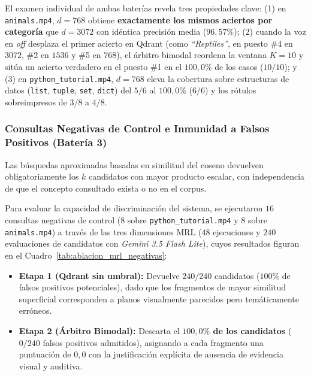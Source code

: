 El examen individual de ambas baterías revela tres propiedades clave: (1) en \texttt{animals.mp4}, $d=768$ obtiene \textbf{exactamente los mismos aciertos por categoría} que $d=3072$ con idéntica precisión media ($96,57\%$); (2) cuando la voz en \textit{off} desplaza el primer acierto en Qdrant (como \textit{``Reptiles''}, en puesto \#4 en $3072$, \#2 en $1536$ y \#5 en $768$), el árbitro bimodal reordena la ventana $K=10$ y sitúa un acierto verdadero en el puesto \#1 en el $100,0\%$ de los casos ($10/10$); y (3) en \texttt{python\_tutorial.mp4}, $d=768$ eleva la cobertura sobre estructuras de datos (\texttt{list}, \texttt{tuple}, \texttt{set}, \texttt{dict}) del $5/6$ al $100,0\%$ ($6/6$) y los rótulos sobreimpresos de $3/8$ a $4/8$.

\subsubsection{Consultas Negativas de Control e Inmunidad a Falsos Positivos (Batería 3)}
Las búsquedas aproximadas basadas en similitud del coseno devuelven obligatoriamente los $k$ candidatos con mayor producto escalar, con independencia de que el concepto consultado exista o no en el corpus.

Para evaluar la capacidad de discriminación del sistema, se ejecutaron $16$ consultas negativas de control ($8$ sobre \texttt{python\_tutorial.mp4} y $8$ sobre \texttt{animals.mp4}) a través de las tres dimensiones MRL ($48$ ejecuciones y $240$ evaluaciones de candidatos con \textit{Gemini 3.5 Flash Lite}), cuyos resultados figuran en el Cuadro~\ref{tab:ablacion_mrl_negativas}:
\begin{itemize}
    \item \textbf{Etapa 1 (Qdrant sin umbral):} Devuelve $240/240$ candidatos ($100\%$ de falsos positivos potenciales), dado que los fragmentos de mayor similitud superficial corresponden a planos visualmente parecidos pero temáticamente erróneos.
    \item \textbf{Etapa 2 (Árbitro Bimodal):} Descarta el \textbf{$100,0\%$ de los candidatos} ($0/240$ falsos positivos admitidos), asignando a cada fragmento una puntuación de $0,0$ con la justificación explícita de ausencia de evidencia visual y auditiva.
\end{itemize}

